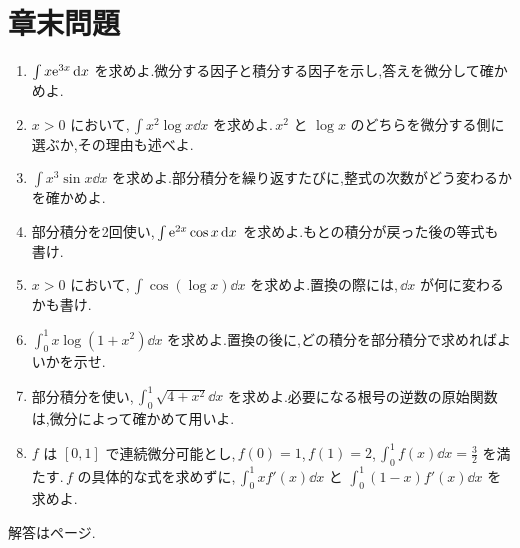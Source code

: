 \section*{章末問題}
\begin{enumerate}[label=\textbf{\thechapter.\arabic*},leftmargin=*]
 \item\label{問:部分一次指数} $\int x\mathrm{e}^{3x}\,\mathrm{d} x$ を求めよ.微分する因子と積分する因子を示し,答えを微分して確かめよ.
 \item\label{問:部分整式対数} $x>0$ において,\,$\int x^2\log x\dd x$ を求めよ.\,$x^2$ と $\log x$ のどちらを微分する側に選ぶか,その理由も述べよ.
 \item\label{問:部分反復} $\int x^3\sin x\dd x$ を求めよ.部分積分を繰り返すたびに,整式の次数がどう変わるかを確かめよ.
 \item\label{問:部分循環} 部分積分を2回使い,\,$\int\mathrm{e}^{2x}\cos x\,\mathrm{d} x$ を求めよ.もとの積分が戻った後の等式も書け.
 \item\label{問:部分対数余弦} $x>0$ において,\,$\int\cos(\log x)\dd x$ を求めよ.置換の際には,\,$\dd x$ が何に変わるかも書け.
 \item\label{問:部分置換定積分} $\int_0^1x\log(1+x^2)\dd x$ を求めよ.置換の後に,どの積分を部分積分で求めればよいかを示せ.
 \item\label{問:部分根号定積分} 部分積分を使い,\,$\int_0^1\sqrt{4+x^2}\dd x$ を求めよ.必要になる根号の逆数の原始関数は,微分によって確かめて用いよ.
 \item\label{問:部分情報だけの計算} $f$ は $[0,1]$ で連続微分可能とし,\,$f(0)=1$,\,$f(1)=2$,\,$\int_0^1f(x)\dd x=\frac32$ を満たす.\,$f$ の具体的な式を求めずに,\,$\int_0^1xf'(x)\dd x$ と $\int_0^1(1-x)f'(x)\dd x$ を求めよ.
\end{enumerate}

\smallskip\noindent 解答は\pageref{解答:第7章}ページ.

